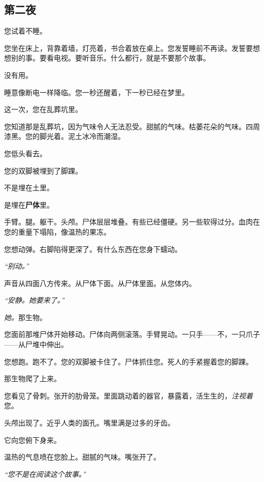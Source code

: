 \subsection*{第二夜}

\noindent 您试着不睡。

\noindent 您坐在床上，背靠着墙，灯亮着，书合着放在桌上。您发誓睡前不再读。发誓要想想别的事。要看电视。要听音乐。什么都行，就是不要那个故事。

\noindent 没有用。

\noindent 睡意像断电一样降临。您一秒还醒着，下一秒已经在梦里。

\noindent 这一次，您在乱葬坑里。

\noindent 您知道那是乱葬坑，因为气味令人无法忍受。甜腻的气味。枯萎花朵的气味。四周漆黑。您的脚光着。泥土冰冷而潮湿。

\noindent 您低头看去。

\noindent 您的双脚被埋到了脚踝。

\noindent 不是埋在土里。

\noindent 是埋在\textbf{尸体}里。

\noindent 手臂。腿。躯干。头颅。尸体层层堆叠。有些已经僵硬。另一些软得过分。血肉在您的重量下塌陷，像温热的果冻。

\noindent 您想动弹。右脚陷得更深了。有什么东西在您身下蠕动。

\noindent \textit{\textquotedblleft{}别动。\textquotedblright{}}

\noindent 声音从四面八方传来。从尸体下面。从尸体里面。从您体内。

\noindent \textit{\textquotedblleft{}安静。她要来了。\textquotedblright{}}

\noindent \textit{她。}那生物。

\noindent 您面前那堆尸体开始移动。尸体向两侧滚落。手臂晃动。一只手——不，一只爪子——从尸堆中伸出。

\noindent 您想跑。跑不了。您的双脚被卡住了。尸体抓住您。死人的手紧握着您的脚踝。

\noindent 那生物爬了上来。

\noindent 您看见了骨刺。张开的肋骨笼。里面跳动着的器官，暴露着，活生生的，\textit{注视着}您。

\noindent 头颅出现了。近乎人类的面孔。嘴里满是过多的牙齿。

\noindent 它向您俯下身来。

\noindent 温热的气息喷在您脸上。甜腻的气味。嘴张开了。

\noindent \textit{\textquotedblleft{}您不是在阅读这个故事。\textquotedblright{}}

